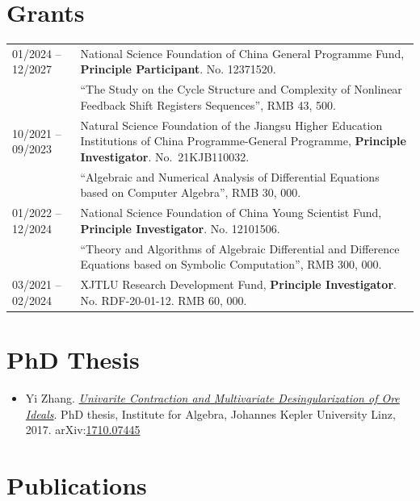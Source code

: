 \documentclass[a4paper,12pt]{article}
\begin{document}
\section*{\Large{Grants}}
\begin{tabular}{@{}p{1.4in}p{4in}}
01/2024 -- 12/2027 &National Science Foundation of China General Programme Fund, \textbf{Principle Participant}. No. 12371520. \\
                                 & ``The Study on the Cycle Structure and Complexity of Nonlinear Feedback Shift Registers Sequences'',
                                 RMB 43, 500. \\
10/2021 -- 09/2023 & Natural Science Foundation of the Jiangsu Higher Education Institutions of China Programme-General Programme, 
                                       \textbf{Principle Investigator}. No.\ 21KJB110032. \\
                                   & ``Algebraic and Numerical Analysis of Differential Equations based on Computer Algebra'', RMB 30, 000. \\     
01/2022 -- 12/2024 & National Science Foundation of China Young Scientist Fund, \textbf{Principle Investigator}. No. 12101506. \\
                                 & ``Theory and Algorithms of Algebraic Differential and Difference Equations based on Symbolic Computation'',
                                 RMB 300, 000. \\
03/2021 -- 02/2024    & XJTLU Research Development Fund, \textbf{Principle Investigator}. No. RDF-20-01-12. RMB 60, 000.

\end{tabular}

\section*{\Large{PhD Thesis}}
\begin{itemize}
 \item Yi Zhang. \href{https://yzhang1616.github.io/yzhang_PhDthesis_final.pdf}{{\em Univarite 
                Contraction and Multivariate Desingularization of Ore Ideals}}. 
                PhD thesis, Institute for Algebra, Johannes Kepler University Linz, 2017. 
                arXiv:\href{https://arxiv.org/abs/1710.07445}{1710.07445}
\end{itemize}

\section*{\Large{Publications}}
\end{document}
